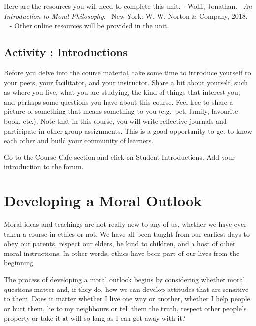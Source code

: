 \documentclass[
]{book}
\begin{document}
Here are the resources you will need to complete this unit.
- Wolff, Jonathan. ~\emph{An Introduction to Moral Philosophy}. ~New York: W. W. Norton \& Company, 2018. ~
- Other online resources will be provided in the unit.

\begin{reflect}
\hypertarget{activity-introductions}{%
\subsection*{Activity : Introductions}\label{activity-introductions}}

Before you delve into the course material, take some time to introduce yourself to your peers, your facilitator, and your instructor. Share a bit about yourself, such as where you live, what you are studying, the kind of things that interest you, and perhaps some questions you have about this course. Feel free to share a picture of something that means something to you (e.g.~pet, family, favourite book, etc.).
Note that in this course, you will write reflective journals and participate in other group assignments. This is a good opportunity to get to know each other and build your community of learners.

Go to the Course Cafe section and click on Student Introductions. Add your introduction to the forum.
\end{reflect}

\hypertarget{developing-a-moral-outlook}{%
\section*{Developing a Moral Outlook}\label{developing-a-moral-outlook}}

Moral ideas and teachings are not really new to any of us, whether we have ever taken a course in ethics or not. We have all been taught from our earliest days to obey our parents, respect our elders, be kind to children, and a host of other moral instructions. In other words, ethics have been part of our lives from the beginning.

The process of developing a moral outlook begins by considering whether moral questions matter and, if they do, how we can develop attitudes that are sensitive to them. Does it matter whether I live one way or another, whether I help people or hurt them, lie to my neighbours or tell them the truth, respect other people's property or take it at will so long as I can get away with it?
\end{document}
